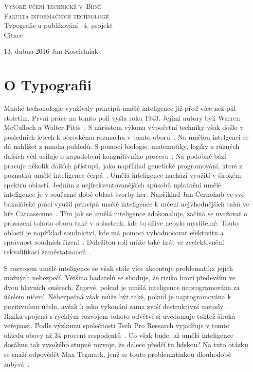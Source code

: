 \documentclass[11pt,a4paper]{article}
\begin{document}
\begin{titlepage}
\begin{center}
\Huge
\textsc{Vysoké učení technické v~Brně}\\
\huge
\textsc{Fakulta informačních technologií\\}
\LARGE
Typografie a publikování\,--\,4. projekt \\
\Huge
Citace
\end{center} 
{\Large 13. dubna 2016 \hfill
Jan Koscielniak}
\end{titlepage}
\section*{O Typografii}

Mnohé techonologie využívaly principů umělé inteligence již před více než půl stoletím.
První práce na tomto poli vyšla roku 1943.
Jejími autory byli Warren McCulloch a Walter Pitts~\citep{NegnevitskyMichael2002Ai}. 
S nárůstem výkonu výpočetní techniky však došlo v posledních letech k obroskému rozmachu v tomto oboru~\citep{What_is_artificial_intelligence}.
Na umělou intelgenci se dá nahlížet z mnoha pohledů.
S pomocí biologie, matematiky, logiky a různých dalších věd usiluje o napadobení kongnitivního procesu~\citep{RagasLudek2017Ui}. 
Na podobné bázi pracuje několik dalších přístupů, jako například genetické programování, které z poznatků umělé inteligence čerpá~\citep{FITPUB11427}.
Umělá inteligence nachází využití v širokém spektru oblastí.
Jedním z nejfrekventovanějších způsobů uplatnění umělé inteligence je v současné době oblast tvorby her.
Například Jan Černohub ve své bakalářské práci využil principů umělé inteligence k určení nejvhodnějších tahů ve hře Carcassonne~\citep{CernohubJan2010Uipd}.
Tím jak se umělá inteligence zdokonaluje, začíná se uvažovat o prosazení tohoto oboru také v oblastech, kde to dříve nebylo myslitelné.
Touto oblastí je například soudnictví, kde má pomoci vyhodnocovat efektivitu a správnost soudních řízení~\citep{PahAdamR2022TPoA}.
Důležitou roli může také hrát ve zeefektivnění rekvalifikací zaměstatnanců~\citep{RobsonRobby2022IlAc}.


S rozvojem umělé inteligence se však stále více akcentuje problematika jejích možných nebezpečí.
Většína badatelů se shoduje, že riziko hrozí především ve dvou hlavních směrech.
Zaprvé, pokud je umělá inteligence naprogramována za účelem ničení. 
Nebezpečná však může být také, pokud je naprogramována k pozitivnímu účelu, avšak k jeho vykonání sama zvolí destruktivní metody~\citep{Future}.
Rizika spojená s rychlým rozvojem tohoto odvětví si uvědomuje taktéž široká veřejnost.
Podle výzkumu společnosti Tech Pro Research vyjadřuje v tomto ohledu obavy až 34 procent respodentů~\citep{Maddox_2015}.
Co však bude, až umělá inteligence dosáhne tak vysokého stupně rozvoje, že dalece předčí tu lidskou?
Na tuto otázku se snaží odpovědět Max Tegmark, jenž se touto problematinkou dlouhodobě zabývá~\citep{TegmarkMax2020Z3:c}.


\newpage
\renewcommand{\refname}{Literatura}


\end{document}
